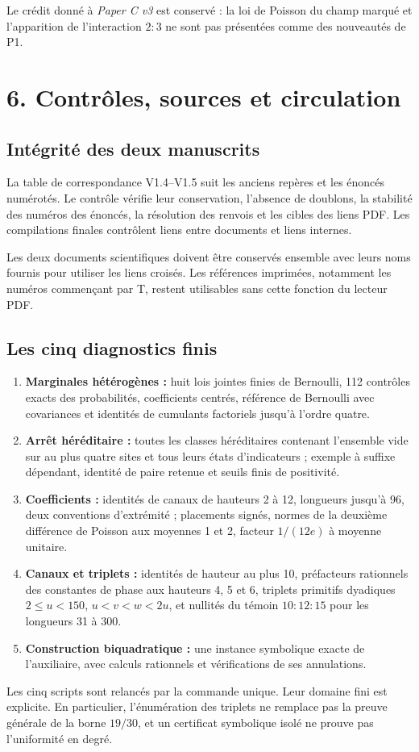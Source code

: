 \documentclass[11pt,a4paper]{article}
\begin{document}
Le crédit donné à \emph{Paper C v3} est conservé : la loi de Poisson
du champ marqué et l'apparition de l'interaction \(2:3\) ne sont pas
présentées comme des nouveautés de P1.

\clearpage
\section*{6. Contrôles, sources et circulation}

\subsection*{Intégrité des deux manuscrits}
La table de correspondance V1.4--V1.5 suit les
\PreservedLabelCount{} anciens repères et les
\NumberedResultCount{} énoncés numérotés. Le contrôle vérifie leur
conservation, l'absence de doublons, la stabilité des numéros des
énoncés, la résolution des renvois et les cibles des liens PDF.
Les compilations finales contrôlent \CrossDocumentLinkCount{} liens
entre documents et \InternalLinkCount{} liens internes.

Les deux documents scientifiques doivent être conservés ensemble
avec leurs noms fournis pour utiliser les liens croisés. Les références
imprimées, notamment les numéros commençant par T, restent utilisables
sans cette fonction du lecteur PDF.

\subsection*{Les cinq diagnostics finis}
\begin{enumerate}
\item \textbf{Marginales hétérogènes :} huit lois jointes finies de Bernoulli,
112 contrôles exacts des probabilités, coefficients centrés, référence
de Bernoulli avec covariances et identités de cumulants factoriels jusqu’à l’ordre quatre.
\item \textbf{Arrêt héréditaire :} toutes les classes héréditaires
contenant l'ensemble vide sur au plus quatre sites et tous leurs
états d'indicateurs ; exemple à suffixe dépendant, identité de
paire retenue et seuils finis de positivité.
\item \textbf{Coefficients :} identités de canaux de hauteurs
2 à 12, longueurs jusqu'à 96, deux conventions d'extrémité ;
placements signés, normes de la deuxième différence de Poisson aux moyennes 1 et 2, facteur
\(1/(12e)\) à moyenne unitaire.
\item \textbf{Canaux et triplets :} identités de hauteur au plus 10,
préfacteurs rationnels des constantes de phase aux hauteurs 4, 5 et 6,
triplets primitifs dyadiques
\(2\le u<150\), \(u<v<w<2u\), et nullités du témoin
\(10:12:15\) pour les longueurs 31 à 300.
\item \textbf{Construction biquadratique :} une instance symbolique
exacte de l'auxiliaire, avec calculs rationnels et vérifications
de ses annulations.
\end{enumerate}
Les cinq scripts sont relancés par la commande unique. Leur domaine
fini est explicite. En particulier, l'énumération des triplets ne
remplace pas la preuve générale de la borne \(19/30\), et un
certificat symbolique isolé ne prouve pas l'uniformité en degré.
\end{document}
